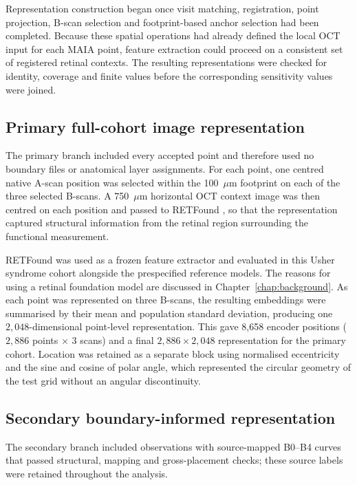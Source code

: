 Representation construction began once visit matching, registration, point projection, B-scan selection and footprint-based anchor selection had been completed. Because these spatial operations had already defined the local OCT input for each MAIA point, feature extraction could proceed on a consistent set of registered retinal contexts. The resulting representations were checked for identity, coverage and finite values before the corresponding sensitivity values were joined.

\subsection{Primary full-cohort image representation}

The primary branch included every accepted point and therefore used no boundary files or anatomical layer assignments. For each point, one centred native A-scan position was selected within the 100~$\mu$m footprint on each of the three selected B-scans. A 750~$\mu$m horizontal OCT context image was then centred on each position and passed to RETFound \citep{Zhou2023RETFound}, so that the representation captured structural information from the retinal region surrounding the functional measurement.

RETFound was used as a frozen feature extractor and evaluated in this Usher syndrome cohort alongside the prespecified reference models. The reasons for using a retinal foundation model are discussed in Chapter~\ref{chap:background}. As each point was represented on three B-scans, the resulting embeddings were summarised by their mean and population standard deviation, producing one $2{,}048$-dimensional point-level representation. This gave 8,658 encoder positions ($2{,}886$ points $\times$ 3 scans) and a final $2{,}886 \times 2{,}048$ representation for the primary cohort. Location was retained as a separate block using normalised eccentricity and the sine and cosine of polar angle, which represented the circular geometry of the test grid without an angular discontinuity.

\subsection{Secondary boundary-informed representation}

The secondary branch included observations with source-mapped B0--B4 curves that passed structural, mapping and gross-placement checks; these source labels were retained throughout the analysis.

